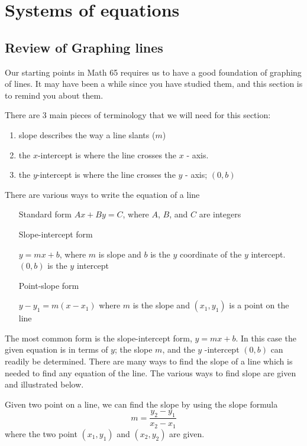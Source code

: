 \chapter{Systems of equations}
\minitoc
\section{Review of Graphing lines}\label{sec:reviewgraphlines}
Our starting points in Math 65 requires us to have a good foundation of graphing of lines. It may
have been a while since you have studied them, and this section is to remind you about them.

There are 3 main pieces of terminology that we will need for this section:
\begin{enumerate}
	\item \gls{slope} describes the way a line slants ($m$)
	\item the $x$-\gls{intercept} is where the line crosses the $x$ - axis.
	\item the $y$-intercept is where the line crosses the $y$ - axis; $(0, b)$
\end{enumerate}
There are various ways to write the \gls{equation} of a line
\begin{itemize}[leftmargin=6cm,font=\bfseries]
	\item[Standard form	]	$Ax+By=C$, where $A$, $B$, and $C$ are integers	
	\item[Slope-intercept form]	\parbox[t]{7cm}{$y=mx+b$, where $m$ is slope and $b$ is the $y$ coordinate of the $y$ intercept. $(0,b)$ is the $y$ intercept} 	
	\item[Point-slope form]	\parbox[t]{7cm}{$y-y_1=m(x-x_1)$ where $m$ is the slope and $(x_1,y_1)$ is a \gls{point} on the line}
\end{itemize}
The most common form is the slope-intercept form, $y = mx + b$. In this case the given equation
is in terms of $y$; the slope $m$, and the $y$ -intercept $(0,b)$ can readily be determined.
There are many ways to find the slope of a line which is needed to find any equation of the line.
The various ways to find slope are given and illustrated below.

Given two point on a line, we can find the slope by using the slope formula
\[
	m = \frac{y_2-y_1}{x_2-x_1}
\]
where the two point $(x_1,y_1)$ and $(x_2,y_2)$ are given.
	
